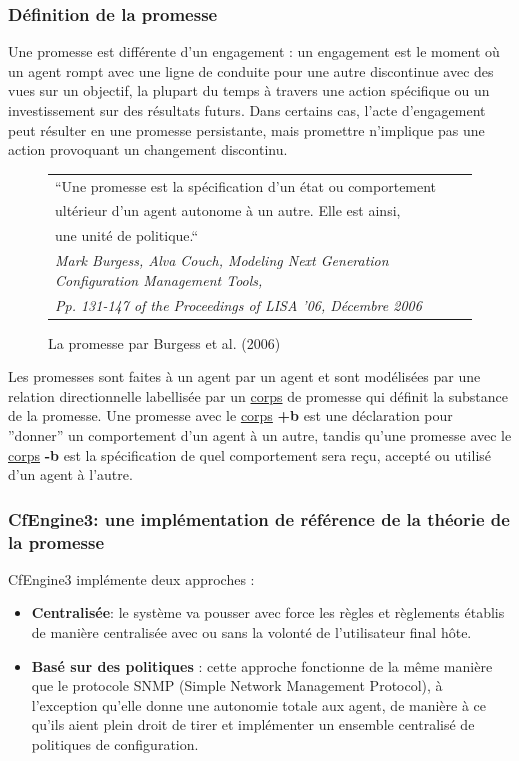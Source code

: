 \subsubsection{Définition de la promesse}

Une promesse est différente d'un engagement : un engagement est le moment où un
agent rompt avec une ligne de conduite pour une autre discontinue avec des vues
sur un objectif, la plupart du temps à travers une action spécifique ou un
investissement sur des résultats futurs. Dans certains cas, l'acte
d'engagement peut résulter en une promesse persistante, mais promettre
n'implique pas une action provoquant un changement discontinu.

\begin{figure}[H]
    \centering
    \begin{tabular}{l}
        ``Une promesse est la spécification d'un état ou comportement \\
        ultérieur d'un agent autonome à un autre. Elle est ainsi, \\
        une unité de politique.`` \cite{burgess_modeling_2006} \\
        \em \footnotesize Mark Burgess, Alva Couch, Modeling Next Generation
        Configuration Management Tools, \\
        \em \footnotesize Pp. 131-147 of the Proceedings of LISA '06,
        Décembre 2006
    \end{tabular}
    \caption{La promesse par Burgess et al. (2006)}
    \label{fig:quote}
\end{figure}

Les promesses sont faites à un agent par un agent et sont modélisées par une
relation directionnelle labellisée par un \underline{corps} de promesse qui définit la
substance de la promesse. Une promesse avec le \underline{corps} \textbf{+b} est 
une déclaration pour ''donner'' un comportement d'un agent à un autre, tandis
qu'une promesse avec le \underline{corps} \textbf{-b} est la spécification de
quel comportement sera reçu, accepté ou utilisé d'un agent à l'autre.

\subsubsection{CfEngine3: une implémentation de référence de la théorie de la
promesse}

CfEngine3 implémente deux approches :

\begin{itemize}
    \item \textbf{Centralisée}: 
        le système va pousser avec force les règles et règlements établis de
        manière centralisée avec ou sans la volonté de l'utilisateur final hôte.
    \item \textbf{Basé sur des politiques} :
        cette approche fonctionne de la même manière que le protocole SNMP
        (Simple Network Management Protocol), à l'exception qu'elle donne une
        autonomie totale aux agent, de manière à ce qu'ils aient plein droit de
        tirer et implémenter un ensemble centralisé de politiques de
        configuration.
\end{itemize}

